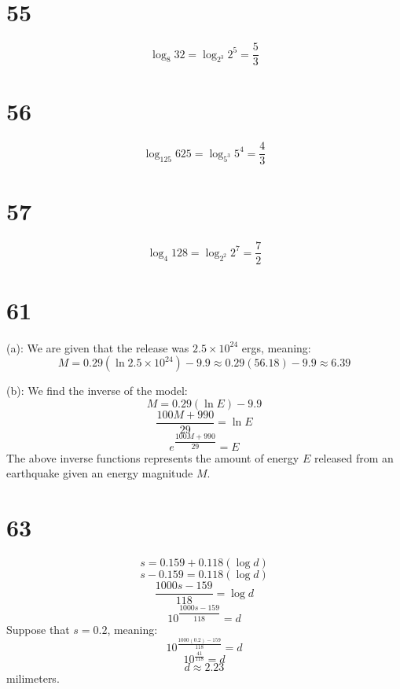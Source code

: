 \documentclass{article}
\theoremstyle{definition}
\newcommand{\?}{\stackrel{?}{=}}
\begin{document}
\section*{55}
\[ \log_{8}32=\log_{2^3}2^5=\frac{5}{3} \]

\section*{56}
\[ \log_{125}625=\log_{5^3}5^4=\frac{4}{3} \]

\section*{57}
\[ \log_4{128}=\log_{2^2}2^7=\frac{7}{2} \]

\section*{61}
(a): We are given that the release was $2.5\times 10^{24}$ ergs, meaning:
\[ M=0.29(\ln{2.5\times 10^{24}})-9.9\approx 0.29(56.18)-9.9\approx 6.39 \]


(b): We find the inverse of the model: \[ M=0.29(\ln{E})-9.9 \] \[ \frac{100M+990}{29}=\ln{E} \] \[ e^{\dfrac{100M+990}{29}}=E \] 
The above inverse functions represents the amount of energy $E$ released from an earthquake given an energy magnitude $M$.

\section*{63}
\[ s=0.159+0.118(\log{d}) \] \[ s-0.159=0.118(\log{d}) \] \[ \frac{1000s-159}{118}=\log{d} \] \[ 10^{\dfrac{1000s-159}{118}}=d \]
Suppose that $s=0.2$, meaning:
\[ 10^{\frac{1000(0.2)-159}{118}}=d \] \[ 10^{\frac{41}{118}}=d \] \[ d\approx 2.23 \]  milimeters.
\end{document}
